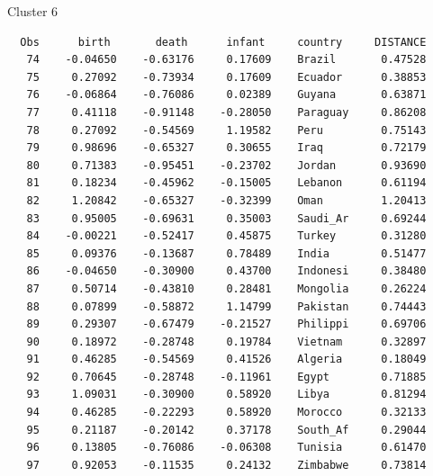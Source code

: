 \documentclass[pdf]{prosper}
\begin{document}
\begin{slide}{Cluster 6}

{\tiny
\begin{verbatim}
  Obs      birth       death      infant     country     DISTANCE
   74    -0.04650    -0.63176     0.17609    Brazil       0.47528
   75     0.27092    -0.73934     0.17609    Ecuador      0.38853
   76    -0.06864    -0.76086     0.02389    Guyana       0.63871
   77     0.41118    -0.91148    -0.28050    Paraguay     0.86208
   78     0.27092    -0.54569     1.19582    Peru         0.75143
   79     0.98696    -0.65327     0.30655    Iraq         0.72179
   80     0.71383    -0.95451    -0.23702    Jordan       0.93690
   81     0.18234    -0.45962    -0.15005    Lebanon      0.61194
   82     1.20842    -0.65327    -0.32399    Oman         1.20413
   83     0.95005    -0.69631     0.35003    Saudi_Ar     0.69244
   84    -0.00221    -0.52417     0.45875    Turkey       0.31280
   85     0.09376    -0.13687     0.78489    India        0.51477
   86    -0.04650    -0.30900     0.43700    Indonesi     0.38480
   87     0.50714    -0.43810     0.28481    Mongolia     0.26224
   88     0.07899    -0.58872     1.14799    Pakistan     0.74443
   89     0.29307    -0.67479    -0.21527    Philippi     0.69706
   90     0.18972    -0.28748     0.19784    Vietnam      0.32897
   91     0.46285    -0.54569     0.41526    Algeria      0.18049
   92     0.70645    -0.28748    -0.11961    Egypt        0.71885
   93     1.09031    -0.30900     0.58920    Libya        0.81294
   94     0.46285    -0.22293     0.58920    Morocco      0.32133
   95     0.21187    -0.20142     0.37178    South_Af     0.29044
   96     0.13805    -0.76086    -0.06308    Tunisia      0.61470
   97     0.92053    -0.11535     0.24132    Zimbabwe     0.73814

\end{verbatim}
}
  
\end{slide}
\end{document}
